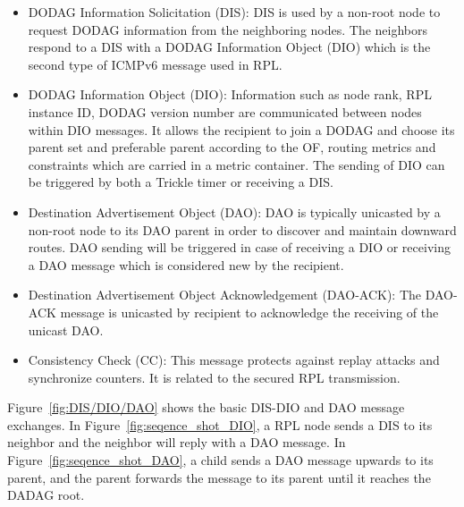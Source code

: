 \begin{itemize}
\item DODAG Information Solicitation (DIS): DIS is used by a non-root node to request DODAG information from the neighboring nodes. The neighbors respond to a DIS with a DODAG Information Object (DIO) which is the second type of ICMPv6 message used in RPL.

\item DODAG Information Object (DIO): Information such as node rank, RPL instance ID, DODAG version number are communicated between nodes within DIO messages. It allows the recipient to join a DODAG and choose its parent set and preferable parent according to the OF, routing metrics and constraints which are carried in a metric container. The sending of DIO can be triggered by both a Trickle timer or receiving a DIS.

\item Destination Advertisement Object (DAO): DAO is typically unicasted by a non-root node to its DAO parent in order to discover and maintain downward routes. DAO sending will be triggered in case of receiving a DIO or receiving a DAO message which is considered new by the recipient.

\item Destination Advertisement Object Acknowledgement (DAO-ACK): The DAO-ACK message is unicasted by recipient to acknowledge the receiving of the unicast DAO.

\item Consistency Check (CC): This message protects against replay attacks and synchronize counters. It is related to the secured RPL transmission.
\end{itemize}

Figure~\ref{fig:DIS/DIO/DAO} shows the basic DIS-DIO and DAO message exchanges. In Figure~\ref{fig:seqence_shot_DIO}, a RPL node sends a DIS to its neighbor and the neighbor will reply with a DAO message. In Figure~\ref{fig:seqence_shot_DAO}, a child sends a DAO message upwards to its parent, and the parent forwards the message to its parent until it reaches the DADAG root.  

